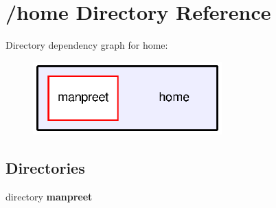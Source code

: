 \section{/home Directory Reference}
\label{dir_75b82e7e4a5feb05200b9ad7adf06257}
Directory dependency graph for home\-:
\nopagebreak
\begin{figure}[H]
\begin{center}
\leavevmode
\includegraphics[width=206pt]{dir_75b82e7e4a5feb05200b9ad7adf06257_dep}
\end{center}
\end{figure}
\subsection*{Directories}
\begin{DoxyCompactItemize}
\item 
directory {\bf manpreet}
\end{DoxyCompactItemize}
